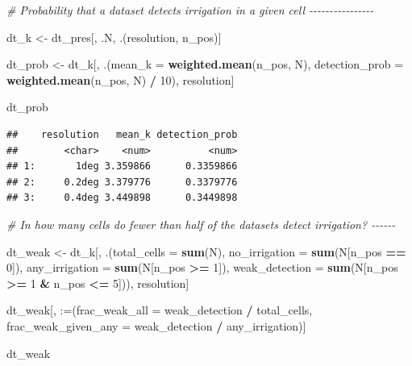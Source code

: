 \documentclass[
  11pt,
]{article}
\newenvironment{Shaded}{\begin{snugshade}}{\end{snugshade}}
\newcommand{\AttributeTok}[1]{\textcolor[rgb]{0.13,0.29,0.53}{#1}}
\newcommand{\CommentTok}[1]{\textcolor[rgb]{0.56,0.35,0.01}{\textit{#1}}}
\newcommand{\DecValTok}[1]{\textcolor[rgb]{0.00,0.00,0.81}{#1}}
\newcommand{\FunctionTok}[1]{\textcolor[rgb]{0.13,0.29,0.53}{\textbf{#1}}}
\newcommand{\NormalTok}[1]{#1}
\newcommand{\OtherTok}[1]{\textcolor[rgb]{0.56,0.35,0.01}{#1}}
\newcommand{\SpecialCharTok}[1]{\textcolor[rgb]{0.81,0.36,0.00}{\textbf{#1}}}
\newcommand{\StringTok}[1]{\textcolor[rgb]{0.31,0.60,0.02}{#1}}
\begin{document}
\begin{Shaded}
\begin{Highlighting}[]
\CommentTok{\# Probability that a dataset detects irrigation in a given cell {-}{-}{-}{-}{-}{-}{-}{-}{-}{-}{-}{-}{-}{-}{-}{-}}

\NormalTok{dt\_k }\OtherTok{\textless{}{-}}\NormalTok{ dt\_pres[, .N, .(resolution, n\_pos)]}

\NormalTok{dt\_prob }\OtherTok{\textless{}{-}}\NormalTok{ dt\_k[, .(}\AttributeTok{mean\_k =} \FunctionTok{weighted.mean}\NormalTok{(n\_pos, N),}
                    \AttributeTok{detection\_prob =} \FunctionTok{weighted.mean}\NormalTok{(n\_pos, N) }\SpecialCharTok{/} \DecValTok{10}\NormalTok{), }
\NormalTok{                resolution]}

\NormalTok{dt\_prob}
\end{Highlighting}
\end{Shaded}

\begin{verbatim}
##    resolution   mean_k detection_prob
##        <char>    <num>          <num>
## 1:       1deg 3.359866      0.3359866
## 2:     0.2deg 3.379776      0.3379776
## 3:     0.4deg 3.449898      0.3449898
\end{verbatim}

\begin{Shaded}
\begin{Highlighting}[]
\CommentTok{\# In how many cells do fewer than half of the datasets detect irrigation? {-}{-}{-}{-}{-}{-}}

\NormalTok{dt\_weak }\OtherTok{\textless{}{-}}\NormalTok{ dt\_k[, .(}\AttributeTok{total\_cells =} \FunctionTok{sum}\NormalTok{(N),}
  \AttributeTok{no\_irrigation =} \FunctionTok{sum}\NormalTok{(N[n\_pos }\SpecialCharTok{==} \DecValTok{0}\NormalTok{]),}
  \AttributeTok{any\_irrigation =} \FunctionTok{sum}\NormalTok{(N[n\_pos }\SpecialCharTok{\textgreater{}=} \DecValTok{1}\NormalTok{]),}
  \AttributeTok{weak\_detection =} \FunctionTok{sum}\NormalTok{(N[n\_pos }\SpecialCharTok{\textgreater{}=} \DecValTok{1} \SpecialCharTok{\&}\NormalTok{ n\_pos }\SpecialCharTok{\textless{}=} \DecValTok{5}\NormalTok{])), resolution]}

\NormalTok{dt\_weak[, }\StringTok{\textasciigrave{}}\AttributeTok{:=}\StringTok{\textasciigrave{}}\NormalTok{(}\AttributeTok{frac\_weak\_all =}\NormalTok{ weak\_detection }\SpecialCharTok{/}\NormalTok{ total\_cells,}
               \AttributeTok{frac\_weak\_given\_any =}\NormalTok{ weak\_detection }\SpecialCharTok{/}\NormalTok{ any\_irrigation)]}

\NormalTok{dt\_weak}
\end{Highlighting}
\end{Shaded}
\end{document}
